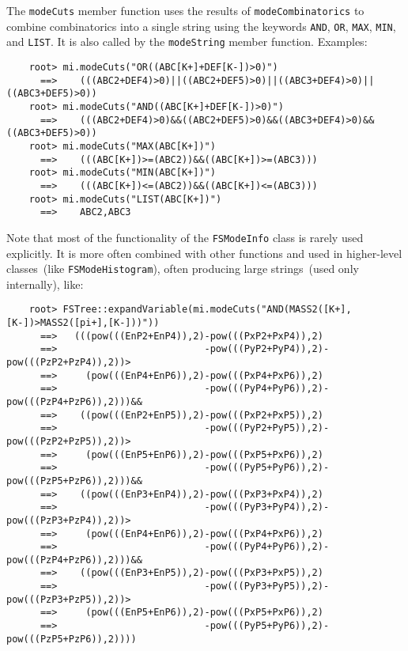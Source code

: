 \documentclass[11pt]{article}
\begin{document}
The {\tt modeCuts} member function uses the results of {\tt modeCombinatorics} to combine combinatorics into a single string using the keywords {\tt AND}, {\tt OR}, {\tt MAX}, {\tt MIN}, and {\tt LIST}.  It is also called by the {\tt modeString} member function.  Examples:
\begin{verbatim}
    root> mi.modeCuts("OR((ABC[K+]+DEF[K-])>0)")
      ==>    (((ABC2+DEF4)>0)||((ABC2+DEF5)>0)||((ABC3+DEF4)>0)||((ABC3+DEF5)>0))
    root> mi.modeCuts("AND((ABC[K+]+DEF[K-])>0)")
      ==>    (((ABC2+DEF4)>0)&&((ABC2+DEF5)>0)&&((ABC3+DEF4)>0)&&((ABC3+DEF5)>0))
    root> mi.modeCuts("MAX(ABC[K+])")
      ==>    (((ABC[K+])>=(ABC2))&&((ABC[K+])>=(ABC3)))
    root> mi.modeCuts("MIN(ABC[K+])")
      ==>    (((ABC[K+])<=(ABC2))&&((ABC[K+])<=(ABC3)))
    root> mi.modeCuts("LIST(ABC[K+])")
      ==>    ABC2,ABC3
\end{verbatim}

Note that most of the functionality of the {\tt FSModeInfo} class is rarely used explicitly.  It is more often combined with other functions and used in higher-level classes~(like {\tt FSModeHistogram}), often producing large strings~(used only internally), like:
\begin{verbatim}
    root> FSTree::expandVariable(mi.modeCuts("AND(MASS2([K+],[K-])>MASS2([pi+],[K-]))"))
      ==>   (((pow(((EnP2+EnP4)),2)-pow(((PxP2+PxP4)),2)
      ==>                          -pow(((PyP2+PyP4)),2)-pow(((PzP2+PzP4)),2))>
      ==>     (pow(((EnP4+EnP6)),2)-pow(((PxP4+PxP6)),2)
      ==>                          -pow(((PyP4+PyP6)),2)-pow(((PzP4+PzP6)),2)))&&
      ==>    ((pow(((EnP2+EnP5)),2)-pow(((PxP2+PxP5)),2)
      ==>                          -pow(((PyP2+PyP5)),2)-pow(((PzP2+PzP5)),2))>
      ==>     (pow(((EnP5+EnP6)),2)-pow(((PxP5+PxP6)),2)
      ==>                          -pow(((PyP5+PyP6)),2)-pow(((PzP5+PzP6)),2)))&&
      ==>    ((pow(((EnP3+EnP4)),2)-pow(((PxP3+PxP4)),2)
      ==>                          -pow(((PyP3+PyP4)),2)-pow(((PzP3+PzP4)),2))>
      ==>     (pow(((EnP4+EnP6)),2)-pow(((PxP4+PxP6)),2)
      ==>                          -pow(((PyP4+PyP6)),2)-pow(((PzP4+PzP6)),2)))&&
      ==>    ((pow(((EnP3+EnP5)),2)-pow(((PxP3+PxP5)),2)
      ==>                          -pow(((PyP3+PyP5)),2)-pow(((PzP3+PzP5)),2))>
      ==>     (pow(((EnP5+EnP6)),2)-pow(((PxP5+PxP6)),2)
      ==>                          -pow(((PyP5+PyP6)),2)-pow(((PzP5+PzP6)),2))))
\end{verbatim} 
\end{document}
